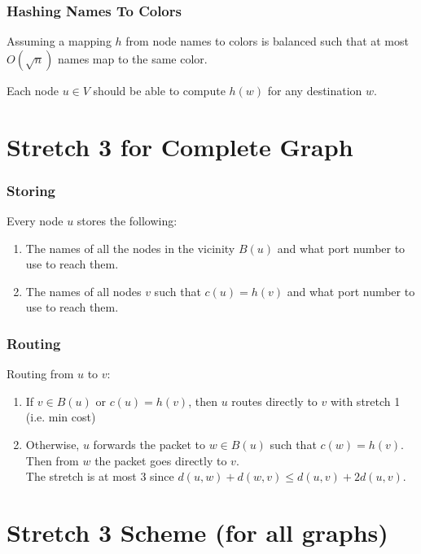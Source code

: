 \documentclass[10pt, compress]{beamer}
\begin{document}
\begin{frame}[fragile]
  \frametitle{Hashing Names To Colors}

  Assuming a mapping $h$ from node names to colors is balanced such that at most $O(\sqrt{n})$ names map to the same color.

  Each node $u\in V$ should be able to compute $h(w)$ for any destination $w$.


\end{frame}

\section{Stretch 3 for Complete Graph}

\begin{frame}[fragile]
  \frametitle{Storing}

  Every node $u$ stores the following:

  \begin{enumerate}
    \item The names of all the nodes in the vicinity $B(u)$ and what port number to use to reach them.
    \item The names of all nodes $v$ such that $c(u)=h(v)$ and what port number to use to reach them.
  \end{enumerate}


\end{frame}


\begin{frame}[fragile]
  \frametitle{Routing}

  Routing from $u$ to $v$:
  \begin{enumerate}
    \item If $v\in B(u)$ or $c(u)=h(v)$, then $u$ routes directly to $v$ with stretch 1 (i.e. min cost)
    \item Otherwise, $u$ forwards the packet to $w\in B(u)$ such that $c(w)=h(v)$. Then from $w$ the packet goes directly to $v$.\\
        The stretch is at most $3$ since $d(u,w) + d(w,v) \leq d(u,v)+2d(u,v)$.
  \end{enumerate}


\end{frame}


\section{Stretch 3 Scheme (for all graphs)}
\end{document}
